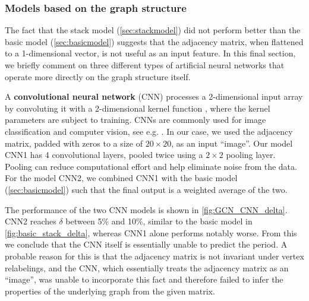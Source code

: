 \documentclass[12pt]{article}
\numberwithin{equation}{section}
\begin{document}
\begin{figure}[htb]
\end{figure}



\subsubsection{Models based on the graph structure}\label{sec:graph_structure}


The fact that the stack model (\cref{sec:stackmodel}) did not perform better than the basic model (\cref{sec:basicmodel}) suggests that the adjacency matrix, when flattened to a 1-dimensional vector, is not useful as an input feature. In this final section, we briefly comment on  three different types of artificial neural networks that operate more directly on the graph structure itself. 

A   \textbf{convolutional neural network} (CNN) processes a 2-dimensional input array  by convoluting it with a 2-dimensional kernel function \cite{goodfellow_deep_2016}, where the kernel parameters   are subject to training. 
CNNs are commonly used for image classification and computer vision, see e.g.  \cite{alzubaidi_review_2021}. In our case, we used the adjacency matrix, padded with zeros to a size of $20\times 20$, as an input \enquote{image}. Our model CNN1 has  4 convolutional layers,   pooled twice using a $2 \times 2$ pooling layer. Pooling can reduce computational effort and help eliminate noise from the data. For the model CNN2, we combined CNN1 with the basic model (\cref{sec:basicmodel}) such that the final output is a weighted average of the two.

The performance of the two CNN models is shown in \cref{fig:GCN_CNN_delta}. CNN2 reaches $\delta$ between 5\% and 10\%, similar to the basic model in \cref{fig:basic_stack_delta}, whereas CNN1 alone performs notably worse. From this we conclude that the CNN itself is essentially unable to predict the period. A probable reason for this is that the adjacency matrix is not invariant under vertex relabelings, and the CNN, which essentially treats the adjacency matrix as an \enquote{image}, was unable to incorporate this fact and therefore failed to infer the properties of the underlying graph from the given matrix. 
\end{document}
